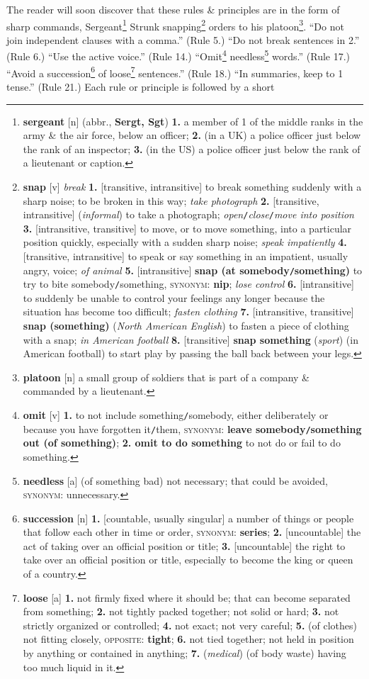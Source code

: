 \documentclass{article}
\begin{document}
The reader will soon discover that these rules \& principles are in the form of sharp commands, Sergeant\footnote{{\bf sergeant} [n] (abbr., {\bf Sergt, Sgt}) {\bf 1.} a member of 1 of the middle ranks in the army \& the air force, below an officer; {\bf 2.} (in a UK) a police officer just below the rank of an inspector; {\bf 3.} (in the US) a police officer just below the rank of a lieutenant or caption.} Strunk snapping\footnote{{\bf snap} [v] {\it break} {\bf 1.} [transitive, intransitive] to break something suddenly with a sharp noise; to be broken in this way; {\it take photograph} {\bf 2.} [transitive, intransitive] ({\it informal}) to take a photograph; {\it open}{\tt/}{\it close}{\tt/}{\it move into position} {\bf 3.} [intransitive, transitive] to move, or to move something, into a particular position quickly, especially with a sudden sharp noise; {\it speak impatiently} {\bf 4.} [transitive, intransitive] to speak or say something in an impatient, usually angry, voice; {\it of animal} {\bf 5.} [intransitive] {\bf snap (at somebody{\tt/}something)} to try to bite somebody{\tt/}something, \textsc{synonym}: {\bf nip}; {\it lose control} {\bf 6.} [intransitive] to suddenly be unable to control your feelings any longer because the situation has become too difficult; {\it fasten clothing} {\bf 7.} [intransitive, transitive] {\bf snap (something)} ({\it North American English}) to fasten a piece of clothing with a snap; {\it in American football} {\bf 8.} [transitive] {\bf snap something} ({\it sport}) (in American football) to start play by passing the ball back between your legs.} orders to his platoon\footnote{{\bf platoon} [n] a small group of soldiers that is part of a company \& commanded by a lieutenant.}. ``Do not join independent clauses with a comma.'' (Rule 5.) ``Do not break sentences in 2.'' (Rule 6.) ``Use the active voice.'' (Rule 14.) ``Omit\footnote{{\bf omit} [v] {\bf 1.} to not include something{\tt/}somebody, either deliberately or because you have forgotten it{\tt/}them, \textsc{synonym}: {\bf leave somebody{\tt/}something out (of something)}; {\bf 2. omit to do something} to not do or fail to do something.} needless\footnote{{\bf needless} [a] (of something bad) not necessary; that could be avoided, \textsc{synonym}: unnecessary.} words.'' (Rule 17.) ``Avoid a succession\footnote{{\bf succession} [n] {\bf 1.} [countable, usually singular] a number of things or people that follow each other in time or order, \textsc{synonym}: {\bf series}; {\bf 2.} [uncountable] the act of taking over an official position or title; {\bf 3.} [uncountable] the right to take over an official position or title, especially to become the king or queen of a country.} of loose\footnote{{\bf loose} [a] {\bf 1.} not firmly fixed where it should be; that can become separated from something; {\bf 2.} not tightly packed together; not solid or hard; {\bf 3.} not strictly organized or controlled; {\bf 4.} not exact; not very careful; {\bf 5.} (of clothes) not fitting closely, \textsc{opposite}: {\bf tight}; {\bf 6.} not tied together; not held in position by anything or contained in anything; {\bf 7.} ({\it medical}) (of body waste) having too much liquid in it.} sentences.'' (Rule 18.) ``In summaries, keep to 1 tense.'' (Rule 21.) Each rule or principle is followed by a short 
\end{document}
